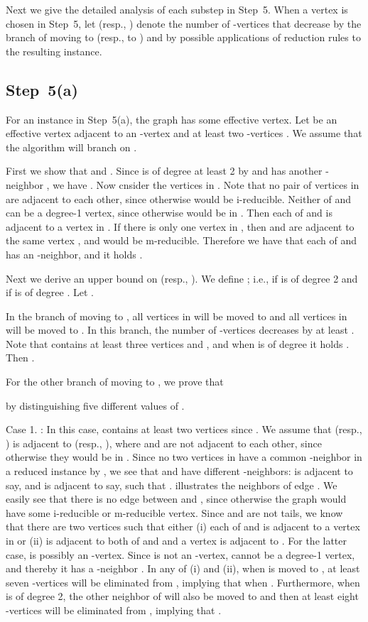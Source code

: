 \documentclass{elsart_TR2}
\begin{document}
Next we give the detailed analysis of each substep  in Step~5.
When a vertex  is chosen in Step~5,
let   (resp., ) denote the number   of
-vertices that decrease by the branch of moving  to  (resp., to )
and by possible applications of reduction rules to the resulting instance.


\subsection{Step~5(a)}
For an instance in Step~5(a),  the graph has some effective vertex.
Let  be an effective vertex adjacent to an -vertex  and at least two -vertices .
We assume that the algorithm will branch on .

First we show that  and .
Since  is of degree at least 2 by  and has another -neighbor , we have .
Now cnsider the vertices in .
Note that no pair of vertices in  are adjacent to each other,
since otherwise  would be i-reducible.
Neither of  and  can be a degree-1 vertex, since otherwise  would be in .
Then each of  and  is adjacent to a vertex in .
If there is only one vertex  in  , then
 and  are adjacent to the same vertex , and  would be m-reducible.
Therefore we have that each of  and   has  an -neighbor,  and it holds .

Next we derive an upper bound on   (resp., ).
We define ; i.e.,   if  is of degree 2
 and  if  is of degree .
Let .

In the branch of moving  to ,  all vertices in 
will be moved to  and all vertices in  will be moved to .
In this branch, the number of -vertices decreases by at least .
Note that  contains at least three vertices  and ,
and when  is  of degree  it holds .
Then  .


For the other branch of moving  to , we prove that

 by distinguishing five different values of .


Case 1. : In this case,  contains at least two vertices  since .
We assume that  (resp., ) is adjacent to  (resp., ),
where   and  are not adjacent to each other, since otherwise they would be in .
Since  no two vertices in   have a common -neighbor in a reduced instance by ,
we see that  and  have different -neighbors:   is adjacent to say, 
 and  is adjacent to say,  such that .
 illustrates the neighbors of edge .
We easily see that there is no edge between  and , since otherwise
 the graph would have  some i-reducible or m-reducible vertex.
Since  and  are not tails, we know that there are two vertices  such that either
(i) each of  and  is adjacent to a vertex in  or
(ii)  is adjacent to both of  and  and a vertex  is adjacent to .
For the latter case,  is possibly an -vertex.
Since  is not an -vertex,  cannot be
a degree-1 vertex, and thereby it has a -neighbor .
In any of (i) and (ii), when  is moved to , at least seven -vertices  will be eliminated from , implying that  when .
Furthermore, when  is of degree 2, the other neighbor  of  will also be moved to  and
then at least eight -vertices  will be eliminated from ,
 implying that .
\end{document}
